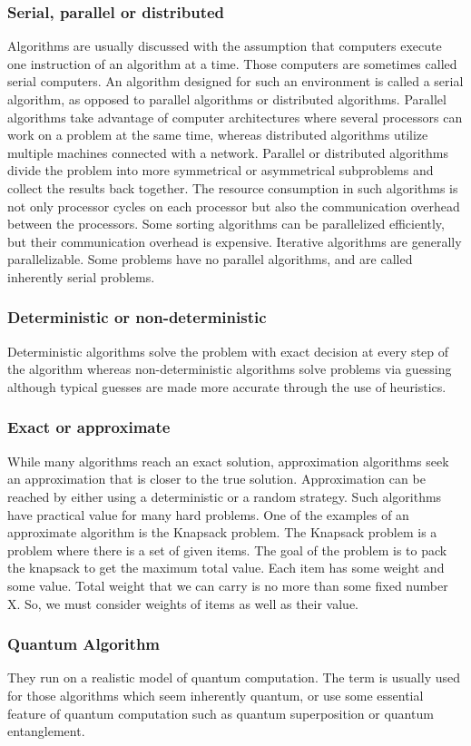 \documentclass[12pt,a4paper]{book}
\begin{document}
\subsubsection{Serial, parallel or distributed}
Algorithms are usually discussed with the assumption that computers execute one instruction of an algorithm at a time. Those computers are sometimes called serial computers. An algorithm designed for such an environment is called a serial algorithm, as opposed to parallel algorithms or distributed algorithms. Parallel algorithms take advantage of computer architectures where several processors can work on a problem at the same time, whereas distributed algorithms utilize multiple machines connected with a network. Parallel or distributed algorithms divide the problem into more symmetrical or asymmetrical subproblems and collect the results back together. The resource consumption in such algorithms is not only processor cycles on each processor but also the communication overhead between the processors. Some sorting algorithms can be parallelized efficiently, but their communication overhead is expensive. Iterative algorithms are generally parallelizable. Some problems have no parallel algorithms, and are called inherently serial problems.
\subsubsection{Deterministic or non-deterministic}
Deterministic algorithms solve the problem with exact decision at every step of the algorithm whereas non-deterministic algorithms solve problems via guessing although typical guesses are made more accurate through the use of heuristics.
\subsubsection{Exact or approximate}
While many algorithms reach an exact solution, approximation algorithms seek an approximation that is closer to the true solution. Approximation can be reached by either using a deterministic or a random strategy. Such algorithms have practical value for many hard problems. One of the examples of an approximate algorithm is the Knapsack problem. The Knapsack problem is a problem where there is a set of given items. The goal of the problem is to pack the knapsack to get the maximum total value. Each item has some weight and some value. Total weight that we can carry is no more than some fixed number X. So, we must consider weights of items as well as their value.
\subsubsection{Quantum Algorithm}
They run on a realistic model of quantum computation. The term is usually used for those algorithms which seem inherently quantum, or use some essential feature of quantum computation such as quantum superposition or quantum entanglement.
\end{document}
